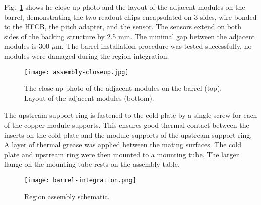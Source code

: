 Fig.~\ref{fig:assembly-closeup} shows he close-up photo and the layout of the adjacent modules on the barrel, demonstrating the two readout chips encapsulated on 3 sides, wire-bonded to the HFCB, the pitch adapter, and the sensor. The sensors extend on both sides of the backing structure by 2.5 mm. The minimal gap between the adjacent modules is 300 $\mu$m. The barrel installation procedure was tested successfully, no modules were damaged during the region integration.

\begin{figure}[hbt] 
\centering 
\texttt{[image: assembly-closeup.jpg]}
\caption{The close-up photo of the adjacent modules on the barrel (top). Layout of the adjacent modules (bottom).}
\label{fig:assembly-closeup}
\end{figure}

The upstream support ring is fastened to the cold plate by a single screw for each of the copper module supports. This ensures good thermal contact between the inserts on the cold plate and the module supports of the upstream support ring. A layer of thermal grease was applied between the mating surfaces. The cold plate and upstream ring were then mounted to a mounting tube. The larger flange on the mounting tube rests on the assembly table. 

\begin{figure}[hbt] 
\centering 
\texttt{[image: barrel-integration.png]}
\caption{Region assembly schematic.}
\label{fig:barrel-integration}
\end{figure}

